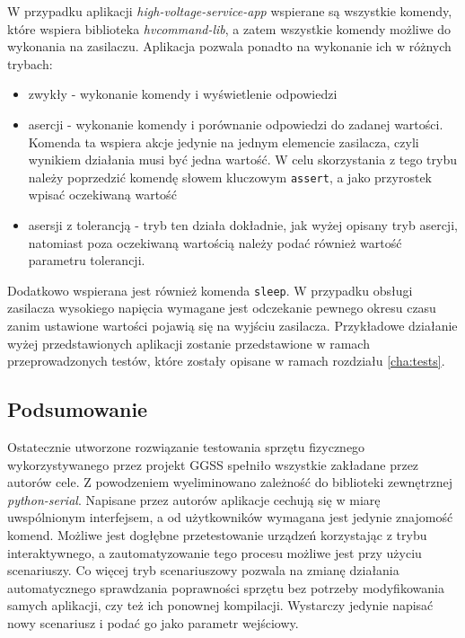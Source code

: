 W przypadku aplikacji \emph{high-voltage-service-app} wspierane są wszystkie komendy, które wspiera biblioteka \emph{hvcommand-lib}, a zatem wszystkie komendy możliwe do wykonania na zasilaczu. Aplikacja pozwala ponadto na wykonanie ich w różnych trybach:
\begin{itemize}
    \item zwykły - wykonanie komendy i wyświetlenie odpowiedzi
    \item asercji - wykonanie komendy i porównanie odpowiedzi do zadanej wartości. Komenda ta wspiera akcje jedynie na jednym elemencie zasilacza, czyli wynikiem działania musi być jedna wartość. W celu skorzystania z tego trybu należy poprzedzić komendę słowem kluczowym \lstinline{assert}, a jako przyrostek wpisać oczekiwaną wartość
    \item asersji z tolerancją - tryb ten działa dokładnie, jak wyżej opisany tryb asercji, natomiast poza oczekiwaną wartością należy podać również wartość parametru tolerancji.
\end{itemize}
Dodatkowo wspierana jest również komenda \lstinline{sleep}. W przypadku obsługi zasilacza wysokiego napięcia wymagane jest odczekanie pewnego okresu czasu zanim ustawione wartości pojawią się na wyjściu zasilacza. Przykładowe działanie wyżej przedstawionych aplikacji zostanie przedstawione w ramach przeprowadzonych testów, które zostały opisane w ramach rozdziału \ref{cha:tests}.


\subsection{Podsumowanie}

Ostatecznie utworzone rozwiązanie testowania sprzętu fizycznego wykorzystywanego przez projekt GGSS spełniło wszystkie zakładane przez autorów cele. Z powodzeniem wyeliminowano zależność do biblioteki zewnętrznej \emph{python-serial}. Napisane przez autorów aplikacje cechują się w miarę uwspólnionym interfejsem, a od użytkowników wymagana jest jedynie znajomość komend. Możliwe jest dogłębne przetestowanie urządzeń korzystając z trybu interaktywnego, a zautomatyzowanie tego procesu możliwe jest przy użyciu scenariuszy. Co więcej tryb scenariuszowy pozwala na zmianę działania automatycznego sprawdzania poprawności sprzętu bez potrzeby modyfikowania samych aplikacji, czy też ich ponownej kompilacji. Wystarczy jedynie napisać nowy scenariusz i podać go jako parametr wejściowy.